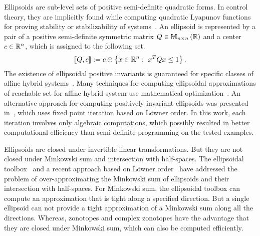 Ellipsoids are sub-level sets of positive semi-definite quadratic
forms.  In control theory, they are implicitly found while computing
quadratic Lyapunov functions for proving stability or stabilizability of
systems~\cite{blanchini2008set}.  An ellipsoid is represented by a pair of a
positive semi-definite symmetric matrix $Q\in\mathbb{M}_{n\times n}\left(\mathbb{R}\right)$ and a center
$c\in\mathbb{R}^n$, which is assigned to the following set.
%
\[
\left\llbracket Q,c\right\rrbracket:=c\oplus\left\{x\in\mathbb{R}^n:~{x}^TQx\leq 1\right\}.
\]
%
The existence of ellipsoidal positive invariants is guaranteed for
specific classes of affine hybrid systems~\cite{shorten2003result}.  Many techniques
for computing ellipsoidal approximations of reachable set for affine
hybrid system use mathematical
optimization~\cite{blanchini2008set,kurzhanskiy2006ellipsoidal,DBLP:conf/hybrid/RouxJGF12}.  An
alternative approach for computing positively invariant ellipsoids was
presented in~\cite{DBLP:journals/tecs/AllamigeonGSGP16}, which uses
fixed point iteration based on L\"owner order.  In this work, each
iteration involves only algebraic computations, which possibly
resulted in better computational efficiency than semi-definite
programming on the tested examples.

Ellipsoids are closed under invertible linear transformations.  But they are not
closed under Minkowski sum and intersection with half-spaces.  The
ellipsoidal toolbox~\cite{kurzhanskiy2006ellipsoidal} and a recent
approach based on L\"owner order~\cite{allamigeon2017fast} have addressed
the problem of over-approximating the Minkowski sum of ellipsoids and
their intersection with half-spaces.  For Minkowski sum, the
ellipsoidal toolbox can compute an approximation that is tight along a
specified direction.  But a single ellipsoid can not provide a tight
approximation of a Minkowski sum along all the directions.  Whereas,
zonotopes and complex zonotopes have the advantage that they are
closed under Minkowski sum, which can also be computed efficiently.

